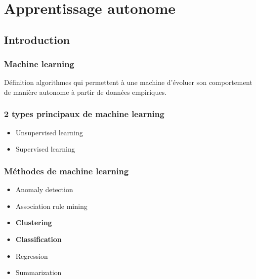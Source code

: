 \documentclass{beamer}
\begin{document}
\section{Apprentissage autonome}
\subsection{Introduction}
\begin{frame}
\frametitle{Machine learning}
\begin{alertblock}{Définition}
algorithmes qui permettent à une machine d'évoluer son comportement de manière autonome à partir de données empiriques.
\end{alertblock}
\end{frame}


\begin{frame}
\frametitle{2 types principaux de machine learning}
\begin{itemize}
\item \huge Unsupervised learning
\item \huge Supervised learning
\end{itemize}
\end{frame}

\begin{frame}
\frametitle{Méthodes de machine learning}
\begin{itemize}
\item Anomaly detection
\item Association rule mining
\item \textbf{Clustering}
\item \textbf{Classification}
\item Regression
\item Summarization
\end{itemize}
\end{frame}
\end{document}
